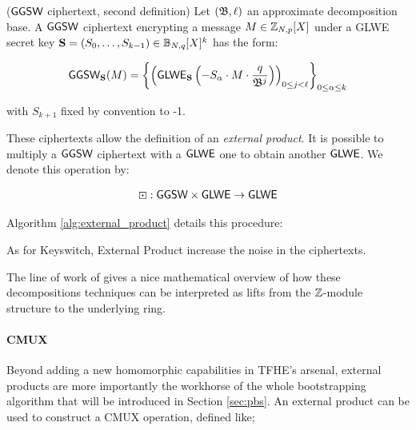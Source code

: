 \begin{definition}($\textsf{GGSW}$ ciphertext, second definition)
	Let $(\mathfrak{B}, \ell)$ an approximate decomposition base. A $\textsf{GGSW}$ ciphertext encrypting a message $M \in \mathbb{Z}_{N,p}[X]$ under a GLWE secret key $\mathbf S =  (S_0, \dots, S_{k-1}) \in \mathbb{B}_{N, q}[X]^k$ has the form:
	
	\begin{equation*}
		\textsf{GGSW}_{\mathbf S}(M) = \left \lbrace \left ( \textsf{GLWE}_{\mathbf S}\left (-S_\alpha \cdot M \cdot \frac{q}{\mathfrak{B}^j} \right) \right )_{0 \le j < \ell} \right \rbrace_{0\le \alpha \le k}
	\end{equation*}
	
	with $S_{k+1}$ fixed by convention to -1.
\end{definition}


These ciphertexts allow the definition of an \textit{external product}. It is possible to multiply a $\textsf{GGSW}$ ciphertext with a $\textsf{GLWE}$ one to obtain another $\textsf{GLWE}$. We denote this operation by:

\begin{equation*}
		\boxdot: \textsf{GGSW} \times \textsf{GLWE} \rightarrow \textsf{GLWE}
\end{equation*}


Algorithm \ref{alg:external_product} details this procedure:




As for Keyswitch, External Product increase the noise in the ciphertexts. 



The line of work of \cite{chimera, AC:BCGGJ24} gives a nice mathematical overview of how these decompositions techniques can be interpreted as lifts from the $\mathbb{Z}$-module structure to the underlying ring. 




\paragraph{CMUX}

Beyond adding a new homomorphic capabilities in TFHE's arsenal, external products are more importantly the workhorse of the whole bootstrapping algorithm that will be introduced in Section \ref{sec:pbs}. An external product can be used to construct a CMUX operation, defined like;

